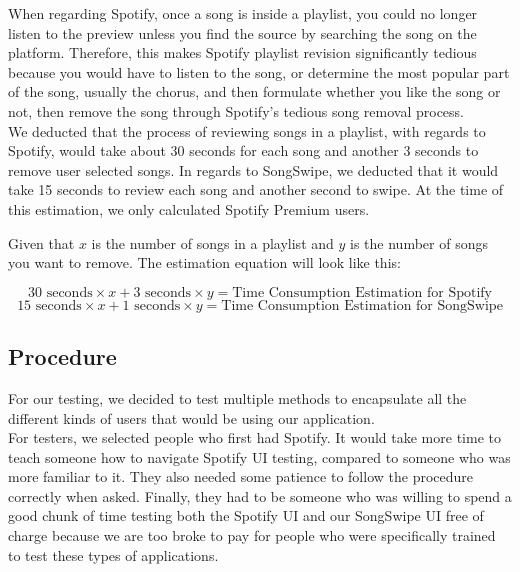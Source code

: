 \documentclass{article}
\begin{document}
When regarding Spotify, once a song is inside a playlist, you could no longer listen to the preview unless you find the source by searching the song on the platform. Therefore, this makes Spotify playlist revision significantly tedious because you would have to listen to the song, or determine the most popular part of the song, usually the chorus, and then formulate whether you like the song or not, then remove the song through Spotify’s tedious song removal process. \\

We deducted that the process of reviewing songs in a playlist, with regards to Spotify, would take about 30 seconds for each song and another 3 seconds to remove user selected songs. In regards to SongSwipe, we deducted that it would take 15 seconds to review each song and another second to swipe. At the time of this estimation, we only calculated Spotify Premium users.

\begin{center}
Given that $x$ is the number of songs in a playlist and $y$ is the number of songs you want to remove. The estimation equation will look like this:
\end{center}
\begin{equation}
30 \text{ seconds} \times x + 3 \text{ seconds} \times y = \text{Time Consumption Estimation for Spotify}
\end{equation}
\begin{equation}
15 \text{ seconds} \times x + 1 \text{ seconds} \times y = \text{Time Consumption Estimation for SongSwipe}
\end{equation}
\subsection{Procedure}
    For our testing, we decided to test multiple methods to encapsulate all the different kinds of users that would be using our application. \\

    For testers, we selected people who first had Spotify. It would take more time to teach someone how to navigate Spotify UI testing, compared to someone who was more familiar to it. They also needed some patience to follow the procedure correctly when asked. Finally, they had to be someone who was willing to spend a good chunk of time testing both the Spotify UI and our SongSwipe UI free of charge because we are too broke to pay for people who were specifically trained to test these types of applications.
\end{document}
